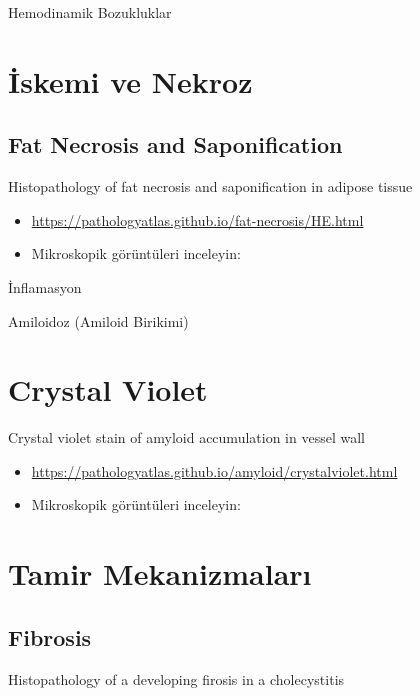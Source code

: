 \documentclass[
  letterpaper,
  DIV=11,
  numbers=noendperiod]{scrreprt}
\begin{document}
Hemodinamik Bozukluklar

\hypertarget{iskemi-ve-nekroz}{%
\chapter{İskemi ve Nekroz}\label{iskemi-ve-nekroz}}

\hypertarget{fat-necrosis-and-saponification}{%
\section{Fat Necrosis and
Saponification}\label{fat-necrosis-and-saponification}}

Histopathology of fat necrosis and saponification in adipose tissue

\begin{itemize}
\item
  \url{https://pathologyatlas.github.io/fat-necrosis/HE.html}
\item
  Mikroskopik görüntüleri inceleyin:
\end{itemize}

İnflamasyon

Amiloidoz (Amiloid Birikimi)

\hypertarget{crystal-violet}{%
\chapter{Crystal Violet}\label{crystal-violet}}

Crystal violet stain of amyloid accumulation in vessel wall

\begin{itemize}
\item
  \url{https://pathologyatlas.github.io/amyloid/crystalviolet.html}
\item
  Mikroskopik görüntüleri inceleyin:
\end{itemize}

\hypertarget{tamir-mekanizmalarux131}{%
\chapter{Tamir Mekanizmaları}\label{tamir-mekanizmalarux131}}

\hypertarget{fibrosis}{%
\section{Fibrosis}\label{fibrosis}}

Histopathology of a developing firosis in a cholecystitis
\end{document}
